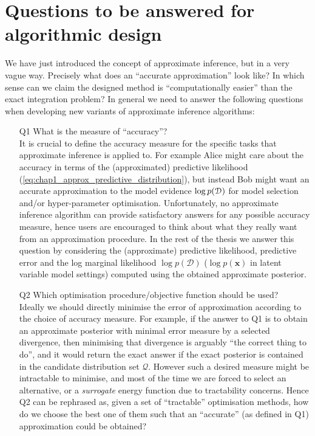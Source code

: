 \section{Questions to be answered for algorithmic design}
We have just introduced the concept of approximate inference, but in a very vague way. Precisely what does an ``accurate approximation'' look like? In which sense can we claim the designed method is ``computationally easier'' than the exact integration problem?
%
In general we need to answer the following questions when developing new variants of approximate inference algorithms:

\begin{itemize}
	\item[Q1] What is the measure of ``accuracy''? \\
	It is crucial to define the accuracy measure for the specific tasks that approximate inference is applied to. For example Alice might care about the accuracy in terms of the (approximated) predictive likelihood (\ref{eq:chap1_approx_predictive_distribution}), but instead Bob might want an accurate approximation to the model evidence $\log p(\mathcal{D})$ for model selection and/or hyper-parameter optimisation. Unfortunately, no approximate inference algorithm can provide satisfactory answers for any possible accuracy measure, hence users are encouraged to think about what they really want from an approximation procedure. In the rest of the thesis we answer this question by considering the (approximate) predictive likelihood, predictive error and the log marginal likelihood $\log p(\mathcal{D})$ ($\log p(\bm{x})$ in latent variable model settings) computed using the obtained approximate posterior. 
	
	\item[Q2] Which optimisation procedure/objective function should be used? \\
	Ideally we should directly minimise the error of approximation according to the choice of accuracy measure. For example, if the answer to Q1 is to obtain an approximate posterior with minimal error measure by a selected divergence, then minimising that divergence is arguably ``the correct thing to do'', and it would return the exact answer if the exact posterior is contained in the candidate distribution set $\mathcal{Q}$. However such a desired measure might be intractable to minimise, and most of the time we are forced to select an alternative, or a \emph{surrogate} energy function due to tractability concerns. Hence Q2 can be rephrased as, given a set of ``tractable'' optimisation methods, how do we choose the best one of them such that an ``accurate'' (as defined in Q1) approximation could be obtained?
	

\end{itemize}
